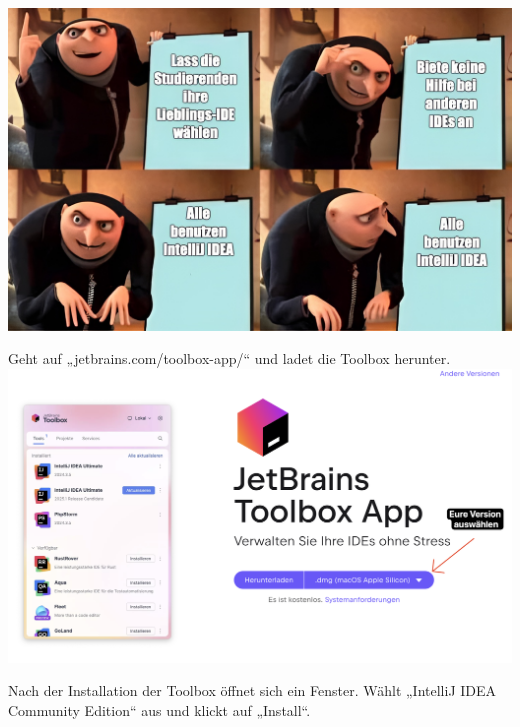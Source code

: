 \documentclass{../../sheet}
\begin{document}
\newpage



\includegraphics[width=1\linewidth]{../img/memeIDE.jpg}



Geht auf „jetbrains.com/toolbox-app/“ und ladet die Toolbox herunter. \\
\includegraphics[width=1\linewidth]{../img/toolBoxDownload.png}

\newpage

Nach der Installation der Toolbox öffnet sich ein
Fenster. Wählt „IntelliJ IDEA
Community Edition“ aus und klickt auf „Install“.\\
\end{document}
